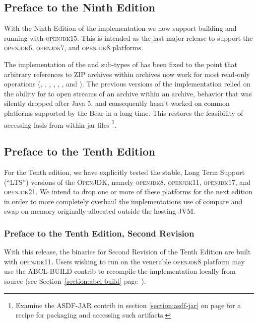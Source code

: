 \documentclass[10pt]{book}
\begin{document}
\subsection{Preface to the Ninth Edition}
With the Ninth Edition of the implementation we now support building
and running with \textsc{openjdk15}.  This is intended as the last
major release to support the \textsc{openjdk6}, \textsc{openjdk7}, and
\textsc{openjdk8} platforms.

The implementation of the  and
 sub-types of  has been fixed
to the point that arbitrary references to \textsc{ZIP} archives within
archives now work for most read-only operations (,
, , ,
, , and
).  The previous versions of the
implementation relied on the ability for  to open
streams of an archive within an archive, behavior that was silently
dropped after Java 5, and consequently hasn't worked on common
platforms supported by the Bear in a long time.  This restores the
feasibility of accessing fasls from within jar files \footnote{Examine
the ASDF-JAR contrib in section \ref{section:asdf-jar} on page
\pageref{section:asdf-jar} for a recipe for packaging and accessing
such artifacts.}.

\subsection{Preface to the Tenth Edition}

For the Tenth edition, we have explicitly tested the stable, Long Term
Support (``LTS'') versions of the \textsc{OpenJDK}, namely
\textsc{openjdk8}, \textsc{openjdk11}, \textsc{openjdk17}, and
\textsc{openjdk21}.  We intend to drop one or more of these platforms
for the next edition in order to more completely overhaul the
implementations use of compare and swap on memory originally allocated
outside the hosting \textsc{JVM}.  

\subsubsection{Preface to the Tenth Edition, Second Revision}

With this release, the binaries for Second Revision of the Tenth
Edition are built with \textsc{openjdk11}.  Users wishing to run on
the venerable \textsc{openjdk8} platform may use the
\textsc{ABCL-BUILD} contrib to recompile the implementation locally
from source (see Section~\ref{section:abcl-build}
page~\pageref{section:abcl-build}).
\end{document}
